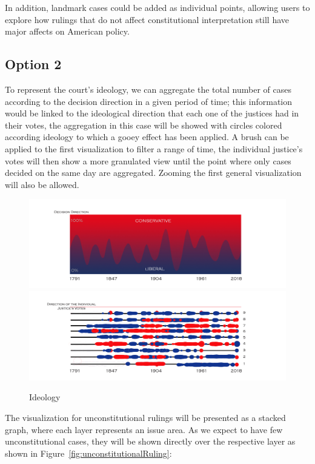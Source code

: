 \documentclass{article}
\begin{document}
In addition, landmark cases could be added as individual points, allowing users to explore how rulings that do not affect constitutional interpretation still have major affects on American policy.

\subsection{Option 2}
To represent the court’s ideology, we can aggregate the total number of cases according to the decision direction in a given period of time; this information would be linked to the ideological direction that each one of the justices had in their votes, the aggregation in this case will be showed with circles colored according ideology to which a gooey effect has been applied. A brush can be applied to the first visualization to filter a range of time, the individual justice’s votes will then show a more granulated view until the point where only cases decided on the same day are aggregated. Zooming the first general visualization will also be allowed.
\begin{figure}[h!]
  \includegraphics[width=\linewidth]{pics/ideologyCourt.jpg}
  \includegraphics[width=\linewidth]{pics/ideologyJustices.jpg}
  \caption{Ideology}
  \label{fig:ideologyCourt}
\end{figure}
\FloatBarrier
The visualization for unconstitutional rulings will be presented as a stacked graph, where each layer represents an issue area. As we expect to have few unconstitutional cases, they will be shown directly over the respective layer as shown in Figure~\ref{fig:unconstitutionalRuling}:
\end{document}
